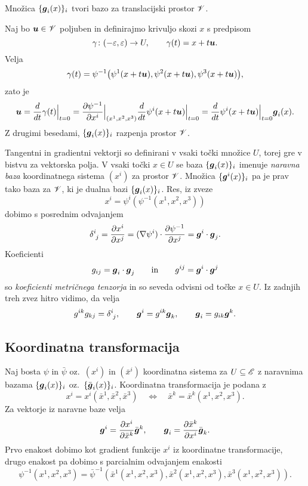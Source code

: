 \begin{trditev}
	Množica $\{\boldsymbol g_i(x)\}_i$ tvori bazo za translacijski prostor $\mathscr V$.
\end{trditev}

\proof
	Naj bo $\boldsymbol u\in\mathscr V$ poljuben in definirajmo krivuljo skozi $x$ s predpisom
	\[ \gamma\colon(-\varepsilon,\varepsilon)\to U,\qquad \gamma(t)=x+t\boldsymbol u. \]
	Velja
	\[ \gamma(t)=\psi^{-1}\big(\psi^1(x+t\boldsymbol u),\psi^2(x+t\boldsymbol u),\psi^3(x+t\boldsymbol u)\big), \]
	zato je
	\[
		\boldsymbol u=\frac{d}{dt}\gamma(t)\Big|_{t=0}=
		\frac{\partial\psi^{-1}}{\partial x^i}\Big|_{(x^1,x^2,x^3)}
		\frac{d}{dt}\psi^i(x+t\boldsymbol u)\Big|_{t=0}=
		\frac{d}{dt}\psi^i(x+t\boldsymbol u)\Big|_{t=0}\boldsymbol g_i(x).
	\]
	Z drugimi besedami, $\{\boldsymbol g_i(x)\}_{i}$ razpenja prostor $\mathscr V$.
\endproof

Tangentni in gradientni vektorji so definirani v vsaki točki množice $U$, torej
gre v bistvu za vektorska polja. V vsaki točki $x\in U$ se baza $\{\boldsymbol g_i(x)\}_i$
imenuje \emph{naravna baza} koordinatnega sistema $(x^i)$ za prostor $\mathscr V$.
Množica $\{\boldsymbol g^i(x)\}_i$ pa je prav tako baza za $\mathscr V$, ki je dualna bazi $\{\boldsymbol g_i(x)\}_i$.
Res, iz zveze
\[ x^i=\psi^i(\psi^{-1}(x^1,x^2,x^3)) \]
dobimo s posrednim odvajanjem
\begin{equation} \label{e:gigj}
	\topbot{\delta}{i}{j}=\frac{\partial x^i}{\partial x^j}=
	(\nabla\psi^i)\cdot\frac{\partial\psi^{-1}}{\partial x^j}=\vek{g}^i\cdot\vek{g}_j.
\end{equation}
Koeficienti
\[ g_{ij}=\boldsymbol g_i\cdot\boldsymbol g_j\qquad\textrm{in}\qquad g^{ij}=\boldsymbol g^i\cdot\boldsymbol g^j \]
so \emph{koeficienti metričnega tenzorja} in so seveda odvisni od točke $x\in U$. 
Iz zadnjih treh zvez hitro vidimo, da velja
\[ g^{ik}g_{kj}=\topbot{\delta}{i}{j},\qquad \vek{g}^i=g^{ik}\vek{g}_k,\qquad \vek{g}_i=g_{ik}\vek{g}^k. \]


\subsection{Koordinatna transformacija}


Naj bosta $\psi$ in $\bar{\psi}$ oz.~$(x^i)$ in $(\bar{x}^i)$ koordinatna sistema za
$U\subseteq\mathscr E$ z naravnima bazama $\{\boldsymbol g_i(x)\}_i$ oz.~$\{\bar{\boldsymbol g}_i(x)\}_i$.
Koordinatna transformacija je podana z
\[
	x^i=x^i(\bar{x}^1,\bar{x}^2,\bar{x}^3)\quad\Longleftrightarrow\quad
	\bar{x}^k=\bar{x}^k(x^1,x^2,x^3).
\]
Za vektorje iz naravne baze velja
\begin{equation} \label{e:gtog}
	\boldsymbol g^i=\frac{\partial x^i}{\partial\bar{x}^k}\bar{\boldsymbol g}^k,\qquad
	\boldsymbol g_i=\frac{\partial\bar{x}^k}{\partial x^i}\bar{\boldsymbol g}_k.
\end{equation}
Prvo enakost dobimo kot gradient funkcije $x^i$ iz koordinatne transformacije,
drugo enakost pa dobimo s parcialnim odvajanjem enakosti
\[ 
	\psi^{-1}(x^1,x^2,x^3)=\bar{\psi}^{-1}(\bar{x}^1(x^1,x^2,x^3),
	\bar{x}^2(x^1,x^2,x^3),\bar{x}^3(x^1,x^2,x^3)).
\]

